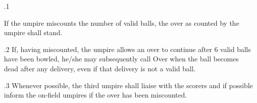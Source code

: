 \documentclass[12pt]{article}
\begin{document}
\vspace{\baselineskip}
{\fontsize{9pt}{10.8pt}.1 \tabto{0.49in} {\fontsize{8pt}{9.6pt}\selectfont If the umpire miscounts the number of valid balls, the over as counted by the umpire shall stand.\par}\par}\par


\vspace{\baselineskip}

\vspace{\baselineskip}

\vspace{\baselineskip}

\vspace{\baselineskip}

\vspace{\baselineskip}

\vspace{\baselineskip}
\begin{Center}
{\fontsize{8pt}{9.6pt}\par}
\end{Center}\par


\vspace{\baselineskip}

\vspace{\baselineskip}
\begin{adjustwidth}{0.5in}{0.21in}
{\fontsize{9pt}{10.8pt}.2 \tabto{0.49in} If, having miscounted, the umpire allows an over to continue after 6 valid balls have been bowled, he/she may subsequently call Over when the ball becomes dead after any delivery, even if that delivery is not a valid ball.\par}\par

\end{adjustwidth}


\vspace{\baselineskip}
\begin{adjustwidth}{0.5in}{0.03in}
{\fontsize{9pt}{10.8pt}.3 \tabto{0.49in} Whenever possible, the third umpire shall liaise with the scorers and if possible inform the on-field umpires if the over has been miscounted.\par}\par

\end{adjustwidth}
\end{document}
